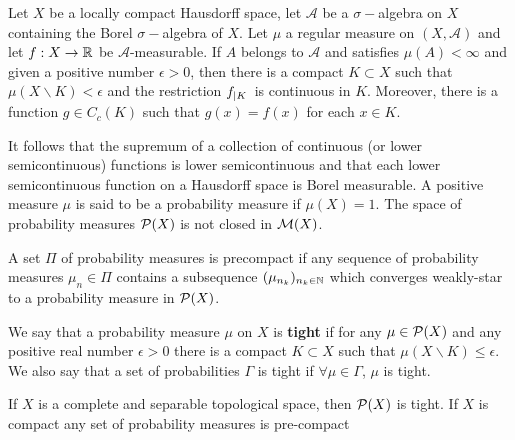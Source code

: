 \begin{theorem}[Luizin]
	Let $X$ be a locally compact Hausdorff space, let $\mathcal A$ be a $\sigma-$algebra on $X$ containing the Borel $\sigma-$algebra of $X$. Let $\mu$ a regular measure on $(X, \mathcal A)$ and let $f:X\rightarrow \Real$ be $\mathcal A$-measurable. If $A$ belongs to $\mathcal{A}$ and satisfies $\mu(A)<\infty$ and given a positive number $\epsilon>0$, then there is a compact $K\subset X$ such that $\mu(X\backslash K)<\epsilon$ and the restriction $\domainrestr{K}{f}$ is continuous in $K$. Moreover, there is a function $g\in C_c(K)$ such that $g(x)=f(x)$ for each $x\in K$. 
\end{theorem}

It follows that the supremum of a collection of continuous (or lower semicontinuous) functions is lower semicontinuous and that each lower semicontinuous function on a Hausdorff space is Borel measurable.  A positive measure $\mu$ is said to be a probability measure if $\mu(X)=1$. The space of probability measures $\PlanSp(X)$ is not closed in $\MeasureSp(X)$. 


A set $\Pi$ of probability measures is precompact if any sequence of probability measures $\mu_n \in \Pi$ contains a subsequence $(\mu_{n_k})_{n_k\in \Naturals}$ which converges weakly-star to a probability measure in $\PlanSp(X)$.

We say that a probability measure $\mu$ on $X$ is \textbf{tight} if for any $\mu\in \PlanSp(X)$ and any positive real number $\epsilon>0$ there is a compact $K\subset X$ such that $\mu(X\backslash K)\leq \epsilon$. We also say that a set of probabilities $\Gamma$ is tight if $\forall \mu \in \Gamma$, $\mu$ is tight.
\begin{theorem}
 If $X$ is a complete and separable topological space, then $\PlanSp(X)$ is tight. If $X$ is compact any set of probability measures is pre-compact
\end{theorem}


